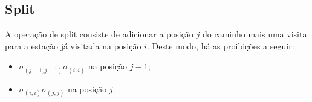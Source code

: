 \subsection{Split}\label{sec:LABEL_CHP_5_SUBSEC_D}

\par A operação de split consiste de adicionar a posição $j$ do caminho mais uma visita para a estação já visitada na posição $i$. Deste modo, há as proibições a seguir:

	\begin{itemize}
        \item $\sigma_{(j-1, j-1)}\sigma_{(i, i)}$ na posição $j-1$;
        \item $\sigma_{(i, i)}\sigma_{(j, j)}$ na posição $j$.
    \end{itemize}